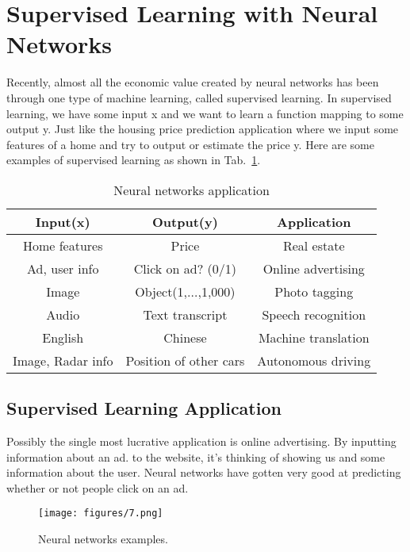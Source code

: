 \documentclass[a4paper]{article}
\begin{document}
\section{Supervised Learning with Neural Networks}

Recently, almost all the economic value created by neural networks has been through one type of machine learning, called supervised learning. In supervised learning, we have some input x and we want to learn a function mapping to some output y. Just like the housing price prediction application where we input some features of a home and try to output or estimate the price y. Here are some examples of supervised learning as shown in Tab.~\ref{t1}.
\begin{table}
	\centering
	\begin{tabular}{c|c|c}
			\hline
			Input(x) & Output(y) &Application  \\
			\hline
			Home features & Price &Real estate\\
			Ad, user info & Click on ad? (0/1) &Online advertising  \\
			Image & Object(1,$\ldots$,1,000) &Photo tagging   \\
			Audio & Text transcript &Speech recognition  \\
			English & Chinese &Machine translation  \\
			Image, Radar info & Position of other cars &Autonomous driving  \\
			\hline
	\end{tabular}
	\caption{Neural networks application}
	\label{t1}
\end{table}

\subsection{Supervised Learning Application}
Possibly the single most lucrative application is online advertising. By inputting information about an ad. to the website, it's thinking of showing us and some information about the user. Neural networks have gotten very good at predicting whether or not people click on an ad. 

\begin{figure}
	\begin{center}
		\texttt{[image: figures/7.png]}
	\end{center}
	\caption{Neural networks examples.}
	\label{p3}
\end{figure}
\end{document}
